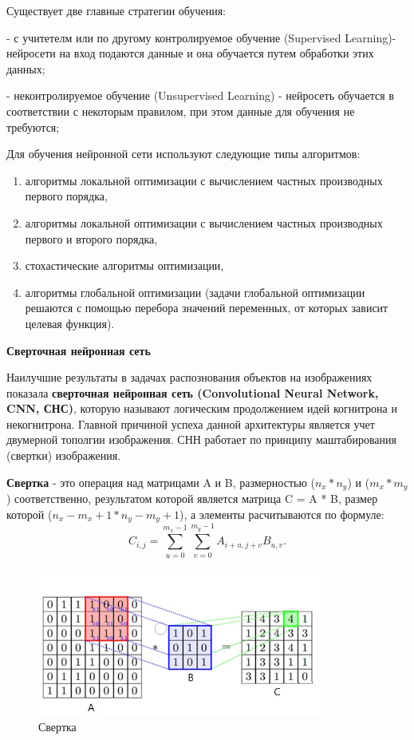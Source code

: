 \documentclass[bachelor, och, coursework]{shiza}
\begin{document}
Существует две главные стратегии обучения:

- с учитетелм или по другому контролируемое обучение (Supervised Learning)- нейросети на вход подаются данные и она обучается путем обработки этих данных;

- неконтролируемое обучение (Unsupervised Learning) - нейросеть обучается в соответствии с некоторым правилом, при этом данные для обучения не требуются;

Для обучения нейронной сети используют следующие типы алгоритмов:

\begin{enumerate}
    \item алгоритмы локальной оптимизации с вычислением частных производных первого порядка,
    \item алгоритмы локальной оптимизации с вычислением частных производных первого и второго порядка,
    \item стохастические алгоритмы оптимизации,
    \item алгоритмы глобальной оптимизации (задачи глобальной оптимизации решаются с помощью перебора значений переменных, от которых зависит целевая функция).
\end{enumerate}

\begin{center}
    \textbf{Сверточная нейронная сеть}
\end{center}

Наилучшие результаты в задачах распознования объектов на изображениях показала \textbf{сверточная нейронная сеть (Convolutional Neural Network, CNN, СНС)}, 
которую называют логическим продолжением идей когнитрона и некогнитрона. Главной причиной успеха данной архитектуры является учет двумерной тополгии изображения.
СНН работает по принципу маштабирования (свертки) изображения.

\textbf{Свертка} - это операция над матрицами A и B, размерностью  ($n_x * n_y$) и ($m_x * m_y$) соответственно, результатом которой является матрица C = A * B,
размер которой ($n_x - m_x + 1 * n_y - m_y + 1$), а элементы расчитываются по формуле:
\begin{equation}
    C_{i,j} = \sum\limits_{u=0}^{m_x-1}\sum\limits_{v=0}^{m_y-1}A_{i+u,j+v}B_{u,v}.
\end{equation}

\begin{figure}[H]
    \centering
    \includegraphics[width=0.85\textwidth]{6}
    \caption{Свертка}
    \label{fig:img1}
\end{figure}
\end{document}

